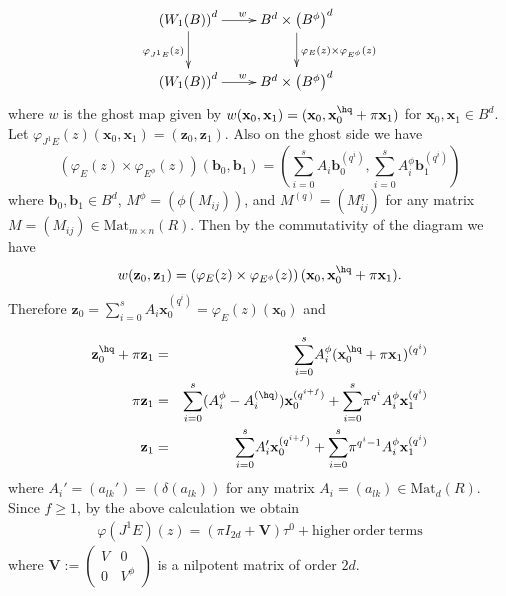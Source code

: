 \documentclass{amsart}
\numberwithin {equation}{section}
\begin{document}
$${
\xymatrix{
\left(W_{1}(B)\right)^d\ar[d]_{\varphi_{J^{1}E}(z)} \ar[r]^{w} &B^d\times \left(B^{\phi}\right)^d\ar[d]^{\varphi_{E}(z)\times \varphi_{E^{\phi}}(z)}  \\
\left(W_{1}(B)\right)^d \ar[r]^{w} &B^d\times \left(B^{\phi}\right)^d }}
$$
where $w$ is the ghost map given by $w(\mathbf{x}_{0},\mathbf{x}_{1})=(\mathbf{x}_{0},\mathbf{x}_{0}^{\hq}+\pi \mathbf{x}_{1})$ for $\mathbf{x}_{0},\mathbf{x}_{1}\in B^d$.
Let $\varphi_{J^{1}E}(z)(\mathbf{x}_{0},\mathbf{x}_{1})=(\mathbf{z}_{0},\mathbf{z}_{1})$. Also on the ghost side we have  $$\left(\varphi_{E}(z)\times \varphi_{E^{\phi}}(z)\right)(\mathbf{b}_{0},\mathbf{b}_{1})=\left(\displaystyle{\sum_{i=0}^{s}} A_{i}\mathbf{b}_{0}^{(q^{i})},\displaystyle{\sum_{i=0}^{s}} A^{\phi}_{i}\mathbf{b}_{1}^{(q^{i})}\right)$$
where $\mathbf{b}_{0},\mathbf{b}_{1}\in B^d $, $M^{\phi}=\left(\phi(M_{ij})\right)$, and $M^{(q)}=\left(M^{q}_{ij}\right)$ for any matrix $M=(M_{ij})\in\mathrm{Mat}_{m\times n}(R)$. Then by the commutativity of the diagram we have  $$w(\mathbf{z}_{0},\mathbf{z}_{1})= \left(\varphi_{E}(z)\times \varphi_{E^{\phi}}(z)\right)(\mathbf{x}_{0},\mathbf{x}_{0}^{\hq}+\pi \mathbf{x}_{1}).$$
Therefore $\mathbf{z}_{0}=\displaystyle{\sum_{i=0}^{s}} A_{i}\mathbf{x}_{0}^{(q^{i})}=\varphi_{E}(z)(\mathbf{x}_{0})$ and 

\begin{eqnarray}
\nonumber \mathbf{z}_{0}^{\hq}+\pi \mathbf{z}_{1}&=& \displaystyle{\sum_{i=0}^{s}} A_{i}^{\phi}(\mathbf{x}_{0}^{\hq}+\pi \mathbf{x}_{1})^{(q^{i})}\\
\nonumber \pi \mathbf{z}_{1}&=& \displaystyle{\sum_{i=0}^{s}} (A_{i}^{\phi}-A_{i}^{(\hq)})\mathbf{x}_{0}^{(q^{i+f})}+\displaystyle{\sum_{i=0}^{s}} \pi^{q^{i}}A_{i}^{\phi}\mathbf{x}_{1}^{(q^{i})}\\
\label{Act_N^1}
 \mathbf{z}_{1}&=&\displaystyle{\sum_{i=0}^{s}} A_{i}'\mathbf{x}_{0}^{(q^{i+f})}+\displaystyle{\sum_{i=0}^{s}} \pi^{q^{i}-1}A_{i}^{\phi}\mathbf{x}_{1}^{(q^{i})}
\end{eqnarray}
\cblue where $A_{i}'=\left(a_{lk}'\right)=\left(\delta(a_{lk})\right)$ for any matrix $A_{i}=(a_{lk})\in\mathrm{Mat}_{d}(R)$.  \color{black}
Since $f\geq 1$, by the above calculation we obtain 
\begin{align}\label{action-J^1}
\varphi(J^{1}E)(z)=(\pi I_{2d}+\mathbf{V})\tau^{0}+\mathrm{higher~ order~ terms}
\end{align}
where $\mathbf{V}:= 
\begin{pmatrix} 
V & 0 \\ 
0 & V^{\phi} 
\end{pmatrix} $ is a nilpotent matrix of order $2d$.
\end{document}
